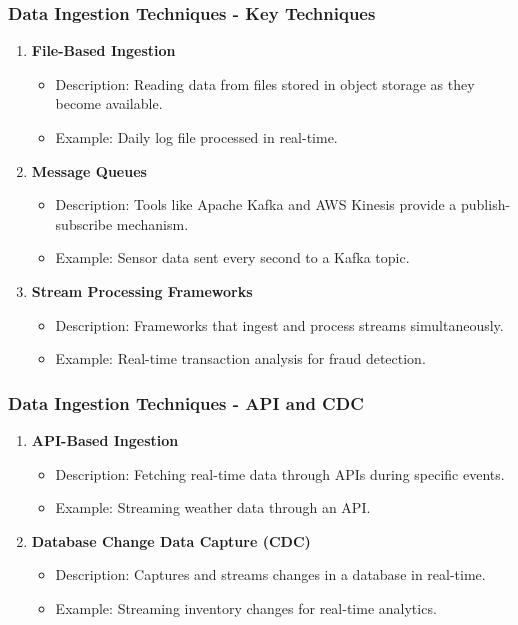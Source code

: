 \documentclass[aspectratio=169]{beamer}
\begin{document}
\begin{frame}[fragile]
    \frametitle{Data Ingestion Techniques - Key Techniques}
    \begin{enumerate}
        \item \textbf{File-Based Ingestion}
        \begin{itemize}
            \item Description: Reading data from files stored in object storage as they become available.
            \item Example: Daily log file processed in real-time.
        \end{itemize}
        \item \textbf{Message Queues}
        \begin{itemize}
            \item Description: Tools like Apache Kafka and AWS Kinesis provide a publish-subscribe mechanism.
            \item Example: Sensor data sent every second to a Kafka topic.
        \end{itemize}
        \item \textbf{Stream Processing Frameworks}
        \begin{itemize}
            \item Description: Frameworks that ingest and process streams simultaneously.
            \item Example: Real-time transaction analysis for fraud detection.
        \end{itemize}
    \end{enumerate}
\end{frame}

\begin{frame}[fragile]
    \frametitle{Data Ingestion Techniques - API and CDC}
    \begin{enumerate}[resume]
        \item \textbf{API-Based Ingestion}
        \begin{itemize}
            \item Description: Fetching real-time data through APIs during specific events.
            \item Example: Streaming weather data through an API.
        \end{itemize}
        \item \textbf{Database Change Data Capture (CDC)}
        \begin{itemize}
            \item Description: Captures and streams changes in a database in real-time.
            \item Example: Streaming inventory changes for real-time analytics.
        \end{itemize}
    \end{enumerate}
\end{frame}
\end{document}
